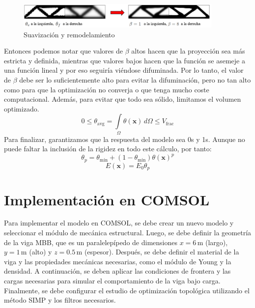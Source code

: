 \documentclass{article}
\theoremstyle{mytheoremstyle}
\theoremstyle{mytheoremstyle}
\theoremstyle{myproblemstyle}
\begin{document}
            \begin{figure}[H]
              \centering
              \includegraphics[width=0.9\textwidth]{1.png}
              \caption{Suavización y remodelamiento}
              \label{fig:suavizacion_remodelamiento}
            \end{figure}
          Entonces podemos notar que valores de $\beta$ altos hacen que la proyección sea más estricta y definida, mientras que valores bajos hacen que la función se asemeje a una función lineal y por eso seguiría viéndose difuminada. Por lo tanto, el valor de $\beta$ debe ser lo suficientemente alto para evitar la difuminación, pero no tan alto como para que la optimización no converja o que tenga mucho coste computacional.
          Además, para evitar que todo sea sólido, limitamos el volumen optimizado.
          \begin{equation}
            0 \leq \theta_{\mathrm{avg}} = \int\limits_{\Omega} \theta(\mathbf{x})\, d\Omega \leq V_{\mathrm{frac}}
          \end{equation}
            Para finalizar, garantizamos que la respuesta del modelo sea 0s y 1s. Aunque no puede faltar la inclusión de la rigidez en todo este cálculo, por tanto:
          \begin{equation}
            \theta_p = \theta_{\min} + (1 - \theta_{\min}) \theta(\mathbf{x})^p
          \end{equation}
          \begin{equation}
            E(\mathbf{x}) = E_0 \theta_p
          \end{equation}
          \section{Implementación en COMSOL}
          Para implementar el modelo en COMSOL, se debe crear un nuevo modelo y seleccionar el módulo de mecánica estructural. Luego, se debe definir la geometría de la viga MBB, que es un paralelepípedo de dimensiones $x = 6\,\mathrm{m}$ (largo), $y = 1\,\mathrm{m}$ (alto) y $z = 0.5\,\mathrm{m}$ (espesor). Después, se debe definir el material de la viga y las propiedades mecánicas necesarias, como el módulo de Young y la densidad. A continuación, se deben aplicar las condiciones de frontera y las cargas necesarias para simular el comportamiento de la viga bajo carga. Finalmente, se debe configurar el estudio de optimización topológica utilizando el método SIMP y los filtros necesarios.
\end{document}
